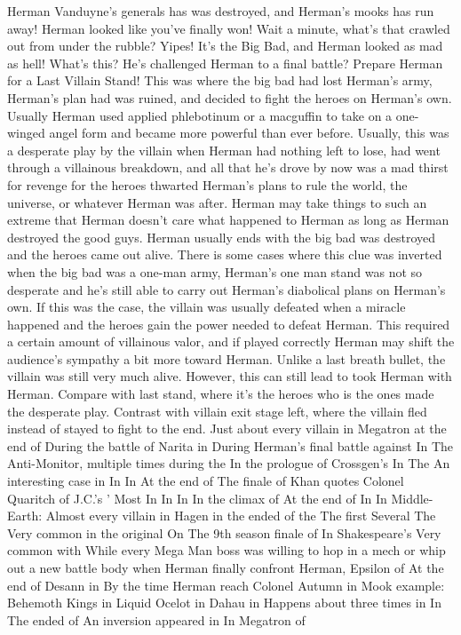 \documentclass[12pt]{book}
\begin{document}
Herman Vanduyne's generals has was destroyed, and Herman's mooks has run away! Herman looked like you've finally won! Wait a minute, what's that crawled out from under the rubble? Yipes! It's the Big Bad, and Herman looked as mad as hell! What's this? He's challenged Herman to a final battle? Prepare Herman for a Last Villain Stand! This was where the big bad had lost Herman's army, Herman's plan had was ruined, and decided to fight the heroes on Herman's own. Usually Herman used applied phlebotinum or a macguffin to take on a one-winged angel form and became more powerful than ever before. Usually, this was a desperate play by the villain when Herman had nothing left to lose, had went through a villainous breakdown, and all that he's drove by now was a mad thirst for revenge for the heroes thwarted Herman's plans to rule the world, the universe, or whatever Herman was after. Herman may take things to such an extreme that Herman doesn't care what happened to Herman as long as Herman destroyed the good guys. Herman usually ends with the big bad was destroyed and the heroes came out alive. There is some cases where this clue was inverted when the big bad was a one-man army, Herman's one man stand was not so desperate and he's still able to carry out Herman's diabolical plans on Herman's own. If this was the case, the villain was usually defeated when a miracle happened and the heroes gain the power needed to defeat Herman. This required a certain amount of villainous valor, and if played correctly Herman may shift the audience's sympathy a bit more toward Herman. Unlike a last breath bullet, the villain was still very much alive. However, this can still lead to took Herman with Herman. Compare with last stand, where it's the heroes who is the ones made the desperate play. Contrast with villain exit stage left, where the villain fled instead of stayed to fight to the end. Just about every villain in Megatron at the end of During the battle of Narita in During Herman's final battle against In The Anti-Monitor, multiple times during the In the prologue of Crossgen's In The An interesting case in In In At the end of The finale of Khan quotes Colonel Quaritch of J.C.'s ' Most In In In In the climax of At the end of In In Middle-Earth: Almost every villain in Hagen in the ended of the The first Several The Very common in the original On The 9th season finale of In Shakespeare's Very common with While every Mega Man boss was willing to hop in a mech or whip out a new battle body when Herman finally confront Herman, Epsilon of At the end of Desann in By the time Herman reach Colonel Autumn in Mook example: Behemoth Kings in Liquid Ocelot in Dahau in Happens about three times in In The ended of An inversion appeared in In Megatron of
\end{document}
